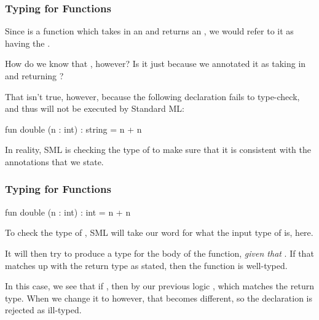 \documentclass[aspectratio=169]{beamer}
\begin{document}
\begin{frame}[fragile]
  \frametitle{Typing for Functions}

  Since  is a function which takes in an  and returns an ,
  we would refer to it as having the  . 

  \pause
  \vspace{\fill}
  
  How do we know that , however? Is it just because we annotated
  it as taking in  and returning ?

  \pause
  \vspace{\fill}

  That isn't true, however, because the following declaration fails to type-check, and thus
  will not be executed by Standard ML:

  \vspace{5pt}

  \begin{codeblock}
    fun double (n : int) : string = n + n
  \end{codeblock}

  \pause
  \vspace{\fill}

  In reality, SML is checking the type of  to make sure that it is consistent
  with the annotations that we state.
\end{frame}

\begin{frame}[fragile]
  \frametitle{Typing for Functions}

  \begin{codeblock}
    fun double (n : int) : int = n + n
  \end{codeblock}

  \pause 

  To check the type of , SML will take our word for what the input type
  of  is, here.

  \pause
  \vspace{\fill}

  It will then try to produce a type for the body of the function, \textit{given that}
  . If that matches up with the return type as stated, then the function is
  well-typed.

  \pause
  \vspace{\fill}

  In this case, we see that if , then by our previous logic ,
  which matches the return type. When we change it to  however, that becomes
  different, so the declaration is rejected as ill-typed.
\end{frame}
\end{document}

